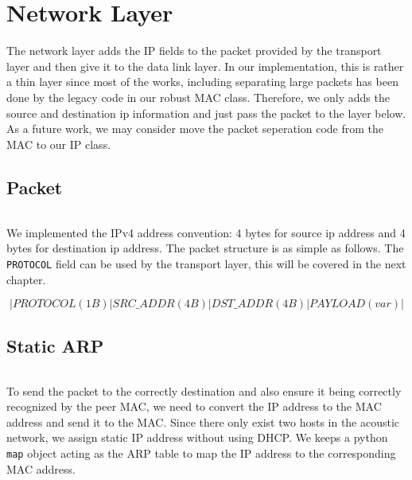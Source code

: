 \chapter{Network Layer}\label{ch:ch4label}

The network layer adds the IP fields to the packet provided by the transport layer and then give it to the data link layer. In our implementation, this is rather a thin layer since most of the works, including separating large packets has been done by the legacy code in our robust MAC class. Therefore, we only adds the source and destination ip information and just pass the packet to the layer below. As a future work, we may consider move the packet seperation code from the MAC to our IP class.

\section{Packet}
    \subparagraph{}
    We implemented the IPv4 address convention: 4 bytes for source ip address and 4 bytes for destination ip address. The packet structure is as simple as follows. The {\tt PROTOCOL} field can be used by the transport layer, this will be covered in the next chapter.

    $$|PROTOCOL(1B)|SRC\_ADDR(4B)|DST\_ADDR(4B)|PAYLOAD(var)|$$

\section{Static ARP}
    \subparagraph{}
    To send the packet to the correctly destination and also ensure it being correctly recognized by the peer MAC, we need to convert the IP address to the MAC address and send it to the MAC. Since there only exist two hosts in the acoustic network, we assign static IP address without using DHCP. We keeps a python {\tt map} object acting as the ARP table to map the IP address to the corresponding MAC address.
